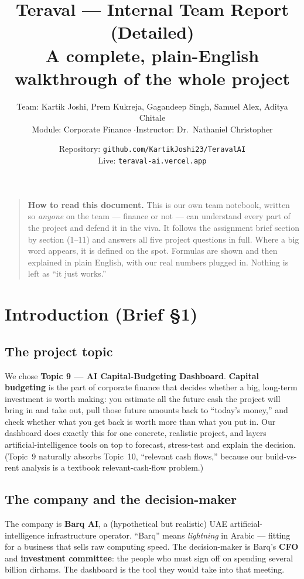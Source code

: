 \documentclass[11pt,a4paper]{article}
\title{\textbf{Teraval --- Internal Team Report (Detailed)}\\[4pt]
\large A complete, plain-English walkthrough of the whole project}
\author{Team: Kartik Joshi, Prem Kukreja, Gagandeep Singh, Samuel Alex, Aditya Chitale\\
Module: Corporate Finance \quad$\cdot$\quad Instructor: Dr.\ Nathaniel Christopher}
\date{Repository: \texttt{github.com/KartikJoshi23/TeravalAI}\\
Live: \texttt{teraval-ai.vercel.app}}
\newcommand{\term}[1]{\textcolor{tvblue}{\textbf{#1}}}
\begin{document}
\maketitle

\begin{quote}
\small \textbf{How to read this document.} This is our own team notebook, written so \emph{anyone}
on the team --- finance or not --- can understand every part of the project and defend it in the
viva. It follows the assignment brief section by section (1--11) and answers all five project
questions in full. Where a big word appears, it is defined on the spot. Formulas are shown and then
explained in plain English, with our real numbers plugged in. Nothing is left as ``it just works.''
\end{quote}

\tableofcontents
\newpage

\section{Introduction (Brief \S1)}

\subsection{The project topic}
We chose \term{Topic 9 --- AI Capital-Budgeting Dashboard}. \term{Capital budgeting} is the part of
corporate finance that decides whether a big, long-term investment is worth making: you estimate all
the future cash the project will bring in and take out, pull those future amounts back to
``today's money,'' and check whether what you get back is worth more than what you put in. Our
dashboard does exactly this for one concrete, realistic project, and layers artificial-intelligence
tools on top to forecast, stress-test and explain the decision. (Topic~9 naturally absorbs Topic~10,
``relevant cash flows,'' because our build-vs-rent analysis is a textbook relevant-cash-flow problem.)

\subsection{The company and the decision-maker}
The company is \term{Barq AI}, a (hypothetical but realistic) UAE artificial-intelligence
infrastructure operator. ``Barq'' means \emph{lightning} in Arabic --- fitting for a business that
sells raw computing speed. The decision-maker is Barq's \term{CFO} and \term{investment committee}:
the people who must sign off on spending several billion dirhams. The dashboard is the tool they
would take into that meeting.
\end{document}
